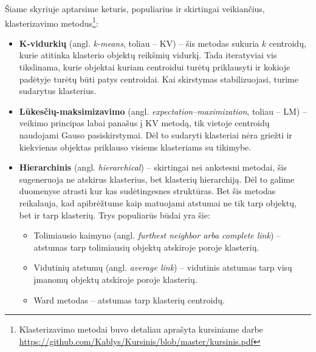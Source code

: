 \documentclass{VUMIFInfBakalaurinis}
\begin{document}
Šiame skyriuje aptarsime keturis, populiarius \cite{wu2008top} ir skirtingai veikiančius, klasterizavimo
metodus\footnote{Klasterizavimo metodai buvo detaliau
  aprašyta kursiniame darbe \url{https://github.com/Kablys/Kursinis/blob/master/kursinis.pdf}}:

\begin{itemize}
\item
  \textbf{K-vidurkių} (angl. \emph{k-means}, toliau -- KV) -- šis
  metodas sukuria $k$ centroidų, kurie atitinka klasterio objektų
  reikšmių vidurkį. Tada iteratyviai vis tikslinama, kurie objektai
  kuriam centroidui turėtų priklausyti ir kokioje padėtyje turėtų būti
  patys centroidai. Kai skirstymas stabilizuojasi, turime sudarytus
  klasterius.
\item
  \textbf{Lūkesčių-maksimizavimo} (angl.
  \emph{expectation--maximization}, toliau -- LM) -- veikimo principas
  labai panašus į KV metodą, tik vietoje centroidų naudojami Gauso
  pasiskirstymai. Dėl to sudaryti klasteriai nėra griežti ir kiekvienas
  objektas priklauso visiems klasteriams su tikimybe.
\item
  \textbf{Hierarchinis} (angl. \emph{hierarchical}) -- skirtingai nei
  ankstesni metodai, šis sugeneruoja ne atskirus klasterius, bet
  klasterių hierarchiją. Dėl to galime duomenyse atrasti kur kas
  sudėtingesnes struktūras. Bet šis metodas reikalauja, kad apibrėžtume
  kaip matuojami atstumai ne tik tarp objektų, bet ir tarp klasterių.
  Trys populiarūs būdai yra šie:

  \begin{itemize}
  \item
    Tolimiausio kaimyno (angl. \emph{furthest neighbor arba complete
    link}) -- atstumas tarp tolimiausių objektų atskiroje poroje
    klasterių.
  \item
    Vidutinių atstumų (angl. \emph{average link}) -- vidutinis atstumas
    tarp visų įmanomų objektų atskiroje poroje klasterių.
  \item
    Ward metodas -- atstumas tarp klasterių centroidų.
  \end{itemize}
  

\end{itemize}
\end{document}
